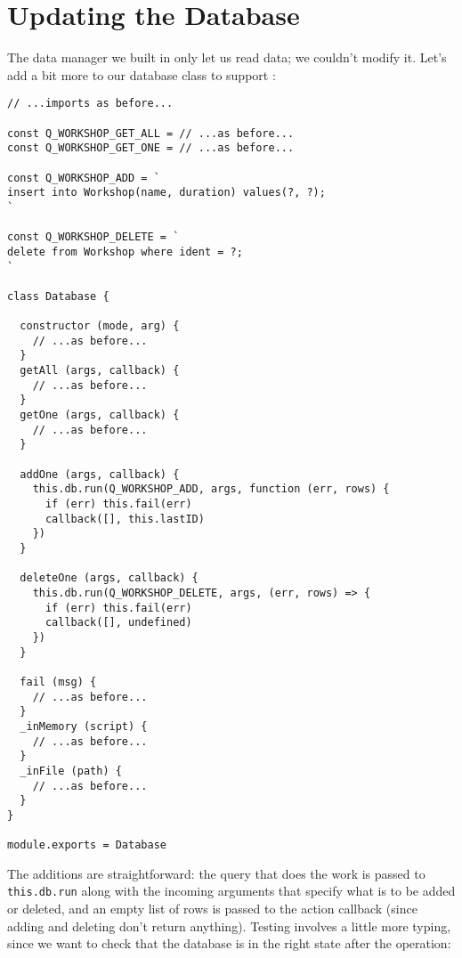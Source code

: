 \section{Updating the Database}\label{s:db-mutate}

The data manager we built in  only let us read data;
we couldn't modify it.
Let's add a bit more to our database class to support :

\begin{verbatim}
// ...imports as before...

const Q_WORKSHOP_GET_ALL = // ...as before...
const Q_WORKSHOP_GET_ONE = // ...as before...

const Q_WORKSHOP_ADD = `
insert into Workshop(name, duration) values(?, ?);
`

const Q_WORKSHOP_DELETE = `
delete from Workshop where ident = ?;
`

class Database {

  constructor (mode, arg) {
    // ...as before...
  }
  getAll (args, callback) {
    // ...as before...
  }
  getOne (args, callback) {
    // ...as before...
  }

  addOne (args, callback) {
    this.db.run(Q_WORKSHOP_ADD, args, function (err, rows) {
      if (err) this.fail(err)
      callback([], this.lastID)
    })
  }

  deleteOne (args, callback) {
    this.db.run(Q_WORKSHOP_DELETE, args, (err, rows) => {
      if (err) this.fail(err)
      callback([], undefined)
    })
  }

  fail (msg) {
    // ...as before...
  }
  _inMemory (script) {
    // ...as before...
  }
  _inFile (path) {
    // ...as before...
  }
}

module.exports = Database
\end{verbatim}

The additions are straightforward:
the query that does the work is passed to \texttt{this.db.run} along with the incoming arguments
that specify what is to be added or deleted,
and an empty list of rows is passed to the action callback
(since adding and deleting don't return anything).
Testing involves a little more typing,
since we want to check that the database is in the right state after the operation:

